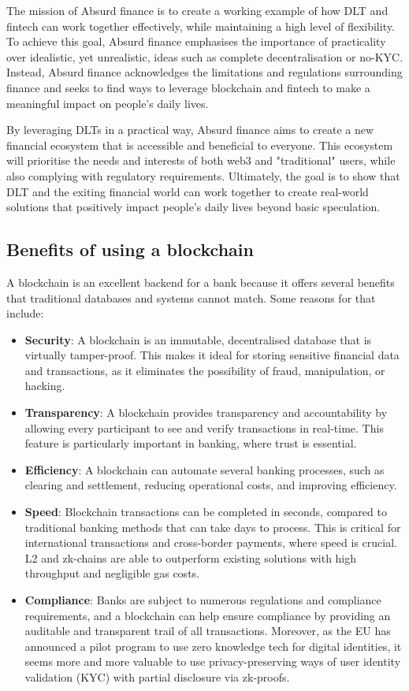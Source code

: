 \documentclass[a4paper,10 pt]{article}
\theoremstyle{definition}
\begin{document}
The mission of Absurd finance is to create a working example of how DLT and fintech can work together effectively, while maintaining a high level of flexibility. To achieve this goal, Absurd finance emphasises the importance of practicality over idealistic, yet unrealistic, ideas such as complete decentralisation or no-KYC. Instead, Absurd finance acknowledges the limitations and regulations surrounding finance and seeks to find ways to leverage blockchain and fintech to make a meaningful impact on people's daily lives.  

By leveraging DLTs in a practical way, Absurd finance aims to create a new financial ecosystem that is accessible and beneficial to everyone. This ecosystem will prioritise the needs and interests of both web3 and "traditional" users, while also complying with regulatory requirements. Ultimately, the goal is to show that DLT and the exiting financial world can work together to create real-world solutions that positively impact people's daily lives beyond basic speculation.

\subsection{Benefits of using a blockchain}
A blockchain is an excellent backend for a bank because it offers several benefits that traditional databases and systems cannot match. Some reasons for that include:  

\begin{itemize}
\item {\bf Security}: A blockchain is an immutable, decentralised database that is virtually tamper-proof. This makes it ideal for storing sensitive financial data and transactions, as it eliminates the possibility of fraud, manipulation, or hacking. 
\item {\bf Transparency}: A blockchain provides transparency and accountability by allowing every participant to see and verify transactions in real-time. This feature is particularly important in banking, where trust is essential. 
\item {\bf Efficiency}: A blockchain can automate several banking processes, such as clearing and settlement, reducing operational costs, and improving efficiency. 
\item {\bf Speed}: Blockchain transactions can be completed in seconds, compared to traditional banking methods that can take days to process. This is critical for international transactions and cross-border payments, where speed is crucial. L2 and zk-chains are able to outperform existing solutions with high throughput and negligible gas costs.
\item {\bf Compliance}: Banks are subject to numerous regulations and compliance requirements, and a blockchain can help ensure compliance by providing an auditable and transparent trail of all transactions. Moreover, as the EU has announced a pilot program to use zero knowledge tech for digital identities, it seems more and more valuable to use privacy-preserving ways of user identity validation (KYC) with partial disclosure via zk-proofs.
\end{itemize}
\end{document}
